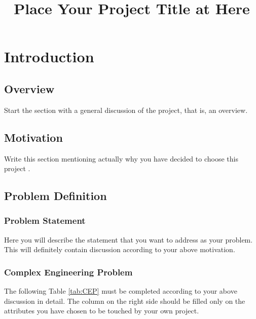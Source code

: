\documentclass[12pt]{report}
\title{Place Your Project Title at Here}
\begin{document}
    
    \tableofcontents
  


\newpage
\chapter{Introduction}

\section{Overview}
Start the section with a general discussion of the project, that is, an overview.

\section{Motivation}
Write this section mentioning actually why you have decided to choose this project \cite{farokhzad2009impact}.

\section{Problem Definition}

\subsection{Problem Statement}
Here you will describe the statement that you want to address as your problem. This will definitely contain discussion according to your above motivation.

\subsection{Complex Engineering Problem}
The following Table \ref{tab:CEP} must be completed according to your above discussion in detail. The column on the right side should be filled only on the attributes you have chosen to be touched by your own project.
\end{document}
